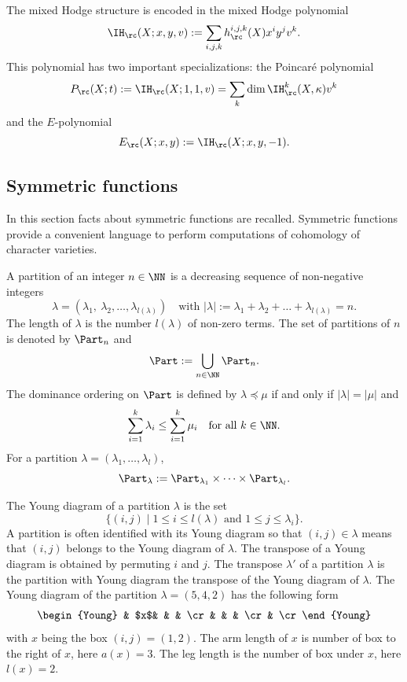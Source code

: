 \begin{definition}\label{def_polynomial_coho}
The mixed Hodge structure is encoded in the mixed Hodge polynomial
\begin{equation}
\IH_{\rc}(X;x,y,v):=\sum_{i,j,k} h_\rc^{i,j,k}(X) x^i y^j v^k.
\end{equation}
This polynomial has two important specializations: the Poincaré polynomial
\begin{equation}
P_{\rc}(X;t):=\IH_{\rc}(X;1,1,v)=\sum_k \dim \IH_{\rc}^k(X,\kappa) v^k
\end{equation}
and the $E$-polynomial
\begin{equation}
E_\rc (X;x,y):=\IH_{\rc} (X;x,y,-1).
\end{equation}
\end{definition}

\subsection{Symmetric functions}
In this section facts about symmetric functions are recalled. Symmetric functions provide a convenient language to perform computations of cohomology of character varieties.
\begin{notations}[Partitions]\label{notations_partitions}
A partition of an integer $n\in\NN$ is a decreasing sequence of non-negative integers
\[
\lambda=(\lambda_1,\ \lambda_2,\dots, \lambda_{l(\lambda)}) \quad\text{with } |\lambda|:=\lambda_1+\lambda_2+\dots+\lambda_{l(\lambda)}=n.
\]
The length of $\lambda$ is the number $l(\lambda)$ of non-zero terms. The set of partitions of $n$ is denoted by $\Part_n$ and
\[
\Part:=\bigcup_{n\in\NN } \Part_n.
\]
The dominance ordering on $\Part$ is defined by $\lambda \preceq \mu$ if and only if
$|\lambda|=|\mu|$ and
\[
\sum_{i=1}^{k}\lambda_i \le \sum_{i=1}^{k}\mu_i \quad\text{for all } k\in \NN.
\]
For a partition $\lambda=(\lambda_1,\dots,\lambda_l)$,
\[
\Part_{\lambda} := \Part_{\lambda_1}\times\dots\times \Part_{\lambda_l}.
\]
\end{notations}
\begin{notations}\label{notations_young}
The Young diagram of a partition $\lambda$ is the set
\[
\lbrace (i,j) \mid 1\le i \le l(\lambda) \text{ and } 1 \le j \le \lambda_i\rbrace.
\]
A partition is often identified with its Young diagram so that $(i,j)\in \lambda$ means that $(i,j)$ belongs to the Young diagram of $\lambda$. The transpose of a Young diagram is obtained by permuting $i$ and $j$. The transpose $\lambda'$ of a partition $\lambda$ is the partition with Young diagram the transpose of the Young diagram of $\lambda$. The Young diagram of the partition $\lambda=(5,4,2)$ has the following form
\[
\begin{Young}
& $x$& & & \cr
& & & \cr
& \cr
\end{Young}
\]
with $x$ being the box $(i,j)=(1,2)$. The arm length of $x$ is number of box to the right of $x$, here $a(x)=3$. The leg length is the number of box under $x$, here $l(x)=2$.
\end{notations}
